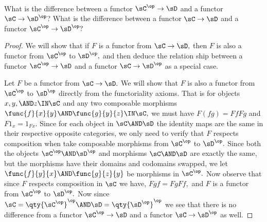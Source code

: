 \documentclass[main.tex]{subfiles}
\begin{document}
\paragraph{}
\begin{exercise}
	What is the difference between a functor
	$ \sC^{\op}\to \sD $ and a functor $ \sC\to \sD^{\op} $? What is the
	difference between a functor  $ \sC \to \sD $ and a functor $ \sC^{\op}\to \sD^{\op}?$
\end{exercise}

\begin{proof}
	We will show that if $ F $ is a functor from $ \sC\to\sD,$ then $ F $ is
	also a functor from $ \sC^\op $ to $ \sD^\op,$ and then deduce the relation
	ship between a functor $ \sC^{\op}\to \sD $ and a functor $ \sC\to
	\sD^{\op}$ as a special case.

	Let $ F $ be a functor from $ \sC\to\sD.$ We will show that $ F $ 
	is also a functor from $ \sC^\op $ to $ \sD^\op$ directly from the 
	functoriality axioms.
	That is for objects $ x,y,\AND z\IN\sC $ and any two composable
	morphisms $ \func{f}{x}{y}\AND \func{g}{y}{z} \IN\sC,$  we must have
	$F(fg)=FfFg$ and $ F1_x=1_{Fx}.$ Since for each object in $ \sC\AND \sD $
	the identity maps are the same in their respective opposite categories, we
	only need to verify that $ F $ respects composition when take composable
	morphisms from $\sC^\op $ to $ \sD^\op.$ Since both the objects $ \sC^\op
	\AND\sD^\op$ and morphisms $ \sC\AND \sD$ are exactly the same, but the morphisms have their domains and codomains swapped, we let $ \func{f}{y}{x} \AND \func{g}{z}{y}$ be morphisms in $ \sC^\op. $ Now observe that since $ F $ respects composition in $ \sC $ we have,
	$ Fgf=FgFf, $ and $ F $ is a functor from $ \sC^\op  $ to $
	\sD^\op. $ Now since $ \sC=\qty{\sC^\op}^\op \AND \sD=\qty{\sD^\op}^\op$ we
	see that there is no difference from a functor $ \sC^{\op} \to \sD $ and a
	functor $ \sC\to \sD^{\op}  $ as well.
\end{proof}
\end{document}
